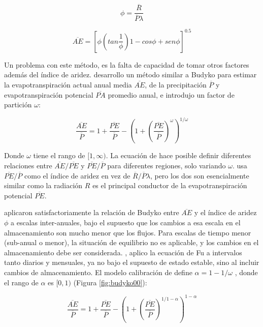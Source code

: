 \documentclass[12pt]{article}
\begin{document}
\begin{equation}
\phi = \frac{\overline{R}}{\overline{P}\lambda}
\end{equation}

\begin{equation}
\overline{AE} = \left [ \phi\left ( tan\frac{1}{\phi}  \right )1 - cos\phi + sen\phi \right ]^{0.5}
\end{equation}

Un problema con este método, es la falta de capacidad de tomar otros factores además del índice de aridez. \citet{Fu1981} desarrollo un método similar a Budyko para estimar la evapotranspiración actual anual media $\overline{AE}$, de la precipitación $\overline{P}$ y evapotranspiración potencial $\overline{PA}$ promedio anual, e introdujo un factor de partición $\omega$: 

\begin{equation}
\frac{\overline{AE}}{\overline{P}} = 1 + \frac{\overline{PE}}{\overline{P}} - \left (1 + \left ( \frac{\overline{PE}}{\overline{P}} \right )^{\omega}  \right )^{1/\omega}
\label{equ:fuEqu}
\end{equation}

Donde $\omega$ tiene el rango de $[1,\infty)$. La ecuación de \citet{Fu1981} hace posible definir diferentes relaciones entre $\overline{AE}/\overline{PE}$ y $\overline{PE}/\overline{P}$ para diferentes regiones, solo variando $\omega$. \citet{Fu1981} usa $\overline{PE}/\overline{P}$ como el índice de aridez en vez de $\overline{R}/\overline{P}\lambda$, pero los dos son esencialmente similar como la radiación $R$ es el principal conductor de la evapotranspiración potencial $\overline{PE}$.

\citet{Koster1999} aplicaron satisfactoriamente la relación de Budyko entre $\overline{AE}$ y el índice de aridez $\phi$ a escalas inter-anuales, bajo el supuesto que los cambios a esa escala en el almacenamiento son mucho menor que los flujos. Para escalas de tiempo menor (sub-anual o menor), la situación de equilibrio no es aplicable, y los cambios en el almacenamiento debe ser considerada. \citet{Zhang2008}, aplico la ecuación de Fu a intervalos tanto diarios y mensuales, ya no bajo el supuesto de estado estable, sino al incluir cambios de almacenamiento. El modelo calibración de \citet{Zhang2008} define $\alpha = 1 - 1/\omega$ , donde el rango de $\alpha$ es $[0,1)$ (Figura \ref{fig:budyko00}):

\begin{equation}
\frac{\overline{AE}}{\overline{P}} = 1 + \frac{\overline{PE}}{\overline{P}} - \left (1 + \left ( \frac{\overline{PE}}{\overline{P}} \right )^{1/1-\alpha}  \right )^{1-\alpha}
\label{equ:eq7}
\end{equation}
\end{document}
